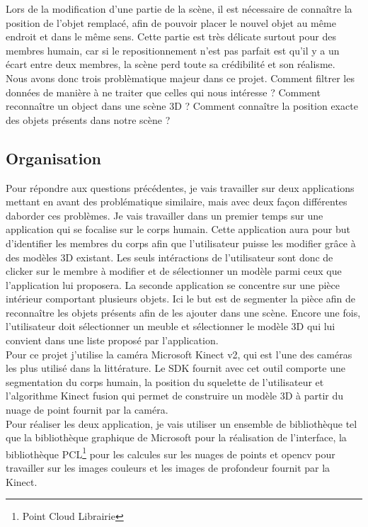 Lors de la modification d'une partie de la scène, il est nécessaire de connaître la position de l'objet remplacé, afin de pouvoir
placer le nouvel objet au même endroit et dans le même sens. Cette partie est très délicate surtout pour des membres humain, car
si le repositionnement n'est pas parfait est qu'il y a un écart entre deux membres, la scène perd toute sa crédibilité et son 
réalisme.\\

Nous avons donc trois problèmatique majeur dans ce projet. Comment filtrer les données de manière à ne traiter que celles qui nous
intéresse ? Comment reconnaître un object dans une scène 3D ? Comment connaître la position exacte des objets présents dans notre
scène ?

\subsection{Organisation}

Pour répondre aux questions précédentes, je vais travailler sur deux applications mettant en avant des problématique similaire,
mais avec deux façon différentes daborder ces problèmes. Je vais travailler dans un premier temps sur une application qui se focalise
sur le corps humain. Cette application aura pour but d'identifier les membres du corps afin que l'utilisateur puisse les modifier
grâce à des modèles 3D existant. Les seuls intéractions de l'utilisateur sont donc de clicker sur le membre à modifier et de sélectionner
un modèle parmi ceux que l'application lui proposera. La seconde application se concentre sur une pièce intérieur comportant plusieurs
objets. Ici le but est de segmenter la pièce afin de reconnaître les objets présents afin de les ajouter dans une scène. Encore une fois,
l'utilisateur doit sélectionner un meuble et sélectionner le modèle 3D qui lui convient dans une liste proposé par l'application.\\

Pour ce projet j'utilise la caméra Microsoft Kinect v2, qui est l'une des caméras les plus utilisé dans la littérature. Le SDK fournit
avec cet outil comporte une segmentation du corps humain, la position du squelette de l'utilisateur et l'algorithme Kinect fusion qui
permet de construire un modèle 3D à partir du nuage de point fournit par la caméra.\\

Pour réaliser les deux application, je vais utiliser un ensemble de bibliothèque tel que la bibliothèque graphique de Microsoft pour
la réalisation de l'interface, la bibliothèque PCL\footnote{Point Cloud Librairie} pour les calcules sur les nuages de points et 
opencv pour travailler sur les images couleurs et les images de profondeur fournit par la Kinect.